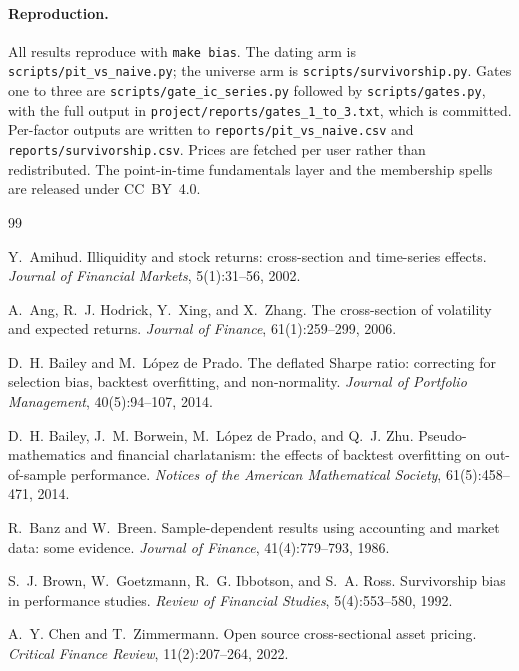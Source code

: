 \documentclass[11pt]{article}
\begin{document}
\paragraph{Reproduction.} All results reproduce with \texttt{make bias}. The dating arm is
\texttt{scripts/pit\_vs\_naive.py}; the universe arm is
\texttt{scripts/survivorship.py}. Gates one to three are
\texttt{scripts/gate\_ic\_series.py} followed by \texttt{scripts/gates.py}, with the
full output in \texttt{project/reports/gates\_1\_to\_3.txt}, which is committed. Per-factor outputs are written to
\texttt{reports/pit\_vs\_naive.csv} and \texttt{reports/survivorship.csv}. Prices are
fetched per user rather than redistributed. The point-in-time fundamentals layer and the
membership spells are released under CC~BY~4.0.

\begin{thebibliography}{99}

Y.~Amihud.
\newblock Illiquidity and stock returns: cross-section and time-series effects.
\newblock \emph{Journal of Financial Markets}, 5(1):31--56, 2002.

A.~Ang, R.~J. Hodrick, Y.~Xing, and X.~Zhang.
\newblock The cross-section of volatility and expected returns.
\newblock \emph{Journal of Finance}, 61(1):259--299, 2006.

D.~H. Bailey and M.~L\'opez de Prado.
\newblock The deflated Sharpe ratio: correcting for selection bias, backtest
  overfitting, and non-normality.
\newblock \emph{Journal of Portfolio Management}, 40(5):94--107, 2014.

D.~H. Bailey, J.~M. Borwein, M.~L\'opez de Prado, and Q.~J. Zhu.
\newblock Pseudo-mathematics and financial charlatanism: the effects of backtest
  overfitting on out-of-sample performance.
\newblock \emph{Notices of the American Mathematical Society}, 61(5):458--471, 2014.

R.~Banz and W.~Breen.
\newblock Sample-dependent results using accounting and market data: some evidence.
\newblock \emph{Journal of Finance}, 41(4):779--793, 1986.

S.~J. Brown, W.~Goetzmann, R.~G. Ibbotson, and S.~A. Ross.
\newblock Survivorship bias in performance studies.
\newblock \emph{Review of Financial Studies}, 5(4):553--580, 1992.

A.~Y. Chen and T.~Zimmermann.
\newblock Open source cross-sectional asset pricing.
\newblock \emph{Critical Finance Review}, 11(2):207--264, 2022.


\end{thebibliography}
\end{document}
